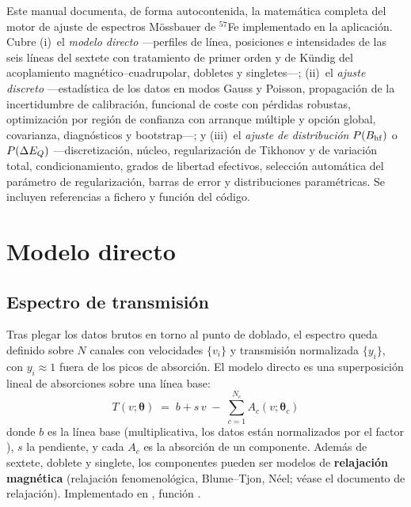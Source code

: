 \noindent
Este manual documenta, de forma autocontenida, la matemática completa del motor de
ajuste de espectros Mössbauer de $^{57}$Fe implementado en la aplicación. Cubre
(i)~el \emph{modelo directo} —perfiles de línea, posiciones e intensidades de las
seis líneas del sextete con tratamiento de primer orden y de Kündig del
acoplamiento magnético–cuadrupolar, dobletes y singletes—; (ii)~el \emph{ajuste
discreto} —estadística de los datos en modos Gauss y Poisson, propagación de la
incertidumbre de calibración, funcional de coste con pérdidas robustas,
optimización por región de confianza con arranque múltiple y opción global,
covarianza, diagnósticos y bootstrap—; y (iii)~el \emph{ajuste de distribución}
$P(B_{\mathrm{hf}})$ o $P(\Delta E_{Q})$ —discretización, núcleo, regularización de Tikhonov y de
variación total, condicionamiento, grados de libertad efectivos, selección
automática del parámetro de regularización, barras de error y distribuciones
paramétricas. Se incluyen referencias a fichero y función del código.



\bigskip

\section{Modelo directo}

\subsection{Espectro de transmisión}\label{sec:fwd}

Tras plegar los datos brutos en torno al punto de doblado, el espectro queda
definido sobre $N$ canales con velocidades $\{v_i\}$ y transmisión normalizada
$\{y_i\}$, con $y_i\approx 1$ fuera de los picos de absorción. El modelo directo
es una superposición lineal de absorciones sobre una línea base:
\begin{equation}
  \boxed{\;
  T(v;\bm\theta) \;=\; b + s\,v \;-\; \sum_{c=1}^{N_c} A_c(v;\bm\theta_c)
  \;}
  \label{eq:Tmodel}
\end{equation}
donde $b$ es la línea base (multiplicativa, los datos están normalizados por el
factor ), $s$ la pendiente, y cada $A_c$ es la absorción de un
componente. Además de sextete, doblete y singlete, los componentes pueden ser
modelos de \textbf{relajación magnética} (relajación fenomenológica, Blume--Tjon,
Néel; véase el documento de relajación). Implementado en ,
función .

